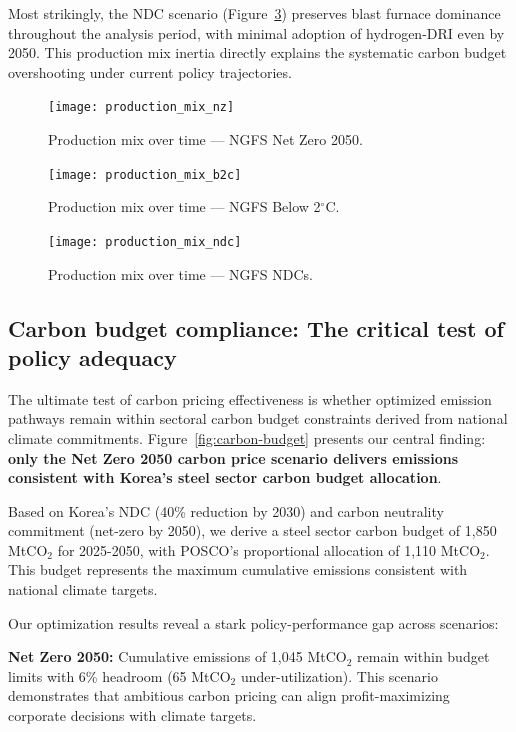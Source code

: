 \documentclass[preprint,5p,authoryear]{elsarticle}
\begin{document}
Most strikingly, the NDC scenario (Figure~\ref{fig:mix-ndc}) preserves blast furnace dominance throughout the analysis period, with minimal adoption of hydrogen-DRI even by 2050. This production mix inertia directly explains the systematic carbon budget overshooting under current policy trajectories.

\begin{figure}[!t]
  \centering
  \texttt{[image: production\_mix\_nz]}
  \caption{Production mix over time --- NGFS Net Zero 2050.}
  \label{fig:mix-nz}
\end{figure}

\begin{figure}[!t]
  \centering
  \texttt{[image: production\_mix\_b2c]}
  \caption{Production mix over time --- NGFS Below 2$^\circ$C.}
  \label{fig:mix-b2c}
\end{figure}

\begin{figure}[!t]
  \centering
  \texttt{[image: production\_mix\_ndc]}
  \caption{Production mix over time --- NGFS NDCs.}
  \label{fig:mix-ndc}
\end{figure}

\subsection{Carbon budget compliance: The critical test of policy adequacy}

The ultimate test of carbon pricing effectiveness is whether optimized emission pathways remain within sectoral carbon budget constraints derived from national climate commitments. Figure~\ref{fig:carbon-budget} presents our central finding: \textbf{only the Net Zero 2050 carbon price scenario delivers emissions consistent with Korea's steel sector carbon budget allocation}.

Based on Korea's NDC (40\% reduction by 2030) and carbon neutrality commitment (net-zero by 2050), we derive a steel sector carbon budget of 1,850 MtCO$_2$ for 2025-2050, with POSCO's proportional allocation of 1,110 MtCO$_2$. This budget represents the maximum cumulative emissions consistent with national climate targets.

Our optimization results reveal a stark policy-performance gap across scenarios:

\textbf{Net Zero 2050:} Cumulative emissions of 1,045 MtCO$_2$ remain within budget limits with 6\% headroom (65 MtCO$_2$ under-utilization). This scenario demonstrates that ambitious carbon pricing can align profit-maximizing corporate decisions with climate targets.
\end{document}
